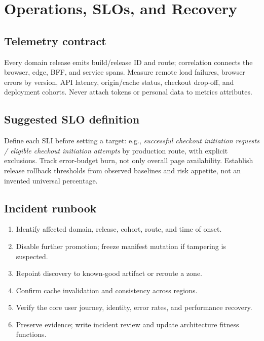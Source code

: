 \documentclass[11pt,letterpaper,oneside]{report}
\begin{document}
\chapter{Operations, SLOs, and Recovery}
\section{Telemetry contract}
Every domain release emits build/release ID and route; correlation connects the browser, edge, BFF, and service spans. Measure remote load failures, browser errors by version, API latency, origin/cache status, checkout drop-off, and deployment cohorts. Never attach tokens or personal data to metrics attributes.
\section{Suggested SLO definition}
Define each SLI before setting a target: e.g., \emph{successful checkout initiation requests / eligible checkout initiation attempts} by production route, with explicit exclusions. Track error-budget burn, not only overall page availability. Establish release rollback thresholds from observed baselines and risk appetite, not an invented universal percentage.
\section{Incident runbook}
\begin{enumerate}\item Identify affected domain, release, cohort, route, and time of onset.
\item Disable further promotion; freeze manifest mutation if tampering is suspected.
\item Repoint discovery to known-good artifact or reroute a zone.
\item Confirm cache invalidation and consistency across regions.
\item Verify the core user journey, identity, error rates, and performance recovery.
\item Preserve evidence; write incident review and update architecture fitness functions.\end{enumerate}
\end{document}
